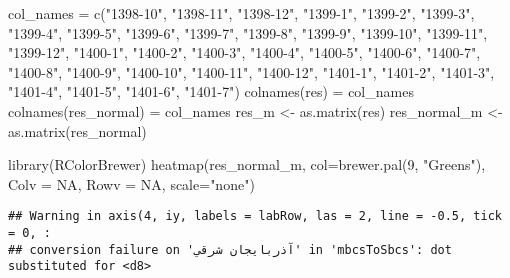 \documentclass[
]{article}
\newenvironment{Shaded}{\begin{snugshade}}{\end{snugshade}}
\newcommand{\AttributeTok}[1]{\textcolor[rgb]{0.77,0.63,0.00}{#1}}
\newcommand{\ConstantTok}[1]{\textcolor[rgb]{0.00,0.00,0.00}{#1}}
\newcommand{\DecValTok}[1]{\textcolor[rgb]{0.00,0.00,0.81}{#1}}
\newcommand{\FunctionTok}[1]{\textcolor[rgb]{0.00,0.00,0.00}{#1}}
\newcommand{\NormalTok}[1]{#1}
\newcommand{\OtherTok}[1]{\textcolor[rgb]{0.56,0.35,0.01}{#1}}
\newcommand{\StringTok}[1]{\textcolor[rgb]{0.31,0.60,0.02}{#1}}
\begin{document}
\begin{Shaded}
\begin{Highlighting}[]
\NormalTok{col\_names }\OtherTok{=} \FunctionTok{c}\NormalTok{(}\StringTok{"1398{-}10"}\NormalTok{, }\StringTok{"1398{-}11"}\NormalTok{, }\StringTok{"1398{-}12"}\NormalTok{, }\StringTok{"1399{-}1"}\NormalTok{, }\StringTok{"1399{-}2"}\NormalTok{, }
                \StringTok{"1399{-}3"}\NormalTok{, }\StringTok{"1399{-}4"}\NormalTok{, }\StringTok{"1399{-}5"}\NormalTok{, }\StringTok{"1399{-}6"}\NormalTok{, }\StringTok{"1399{-}7"}\NormalTok{, }
                \StringTok{"1399{-}8"}\NormalTok{, }\StringTok{"1399{-}9"}\NormalTok{, }\StringTok{"1399{-}10"}\NormalTok{, }\StringTok{"1399{-}11"}\NormalTok{, }\StringTok{"1399{-}12"}\NormalTok{,}
                \StringTok{"1400{-}1"}\NormalTok{, }\StringTok{"1400{-}2"}\NormalTok{, }\StringTok{"1400{-}3"}\NormalTok{, }\StringTok{"1400{-}4"}\NormalTok{, }\StringTok{"1400{-}5"}\NormalTok{, }\StringTok{"1400{-}6"}\NormalTok{, }\StringTok{"1400{-}7"}\NormalTok{, }
                \StringTok{"1400{-}8"}\NormalTok{, }\StringTok{"1400{-}9"}\NormalTok{, }\StringTok{"1400{-}10"}\NormalTok{, }\StringTok{"1400{-}11"}\NormalTok{, }\StringTok{"1400{-}12"}\NormalTok{,}
                \StringTok{"1401{-}1"}\NormalTok{, }\StringTok{"1401{-}2"}\NormalTok{, }\StringTok{"1401{-}3"}\NormalTok{, }\StringTok{"1401{-}4"}\NormalTok{, }\StringTok{"1401{-}5"}\NormalTok{, }\StringTok{"1401{-}6"}\NormalTok{, }\StringTok{"1401{-}7"}\NormalTok{)}
\FunctionTok{colnames}\NormalTok{(res) }\OtherTok{=}\NormalTok{ col\_names}
\FunctionTok{colnames}\NormalTok{(res\_normal) }\OtherTok{=}\NormalTok{ col\_names}
\NormalTok{res\_m }\OtherTok{\textless{}{-}} \FunctionTok{as.matrix}\NormalTok{(res)}
\NormalTok{res\_normal\_m }\OtherTok{\textless{}{-}} \FunctionTok{as.matrix}\NormalTok{(res\_normal)}

\FunctionTok{library}\NormalTok{(RColorBrewer)  }
\FunctionTok{heatmap}\NormalTok{(res\_normal\_m, }\AttributeTok{col=}\FunctionTok{brewer.pal}\NormalTok{(}\DecValTok{9}\NormalTok{, }\StringTok{"Greens"}\NormalTok{), }\AttributeTok{Colv =} \ConstantTok{NA}\NormalTok{, }\AttributeTok{Rowv =} \ConstantTok{NA}\NormalTok{, }\AttributeTok{scale=}\StringTok{"none"}\NormalTok{)}
\end{Highlighting}
\end{Shaded}

\begin{verbatim}
## Warning in axis(4, iy, labels = labRow, las = 2, line = -0.5, tick = 0, :
## conversion failure on 'آذربايجان شرقي' in 'mbcsToSbcs': dot substituted for <d8>
\end{verbatim}
\end{document}
